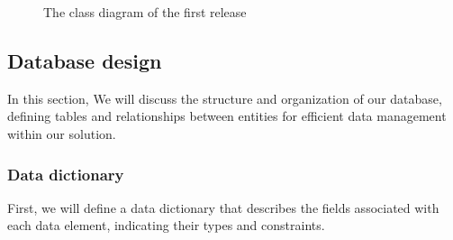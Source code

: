 \begin{figure}[hbt!]
    \centering
    
    \caption{The class diagram of the first release}
    \label{r1-class}
\end{figure}

\subsection{Database design}
In this section, We will discuss the structure and organization of our database, defining tables and relationships
between entities for efficient data management within our solution.

\subsubsection{Data dictionary}

First, we will define a data dictionary that describes the fields associated with each data element,
indicating their types and constraints.

